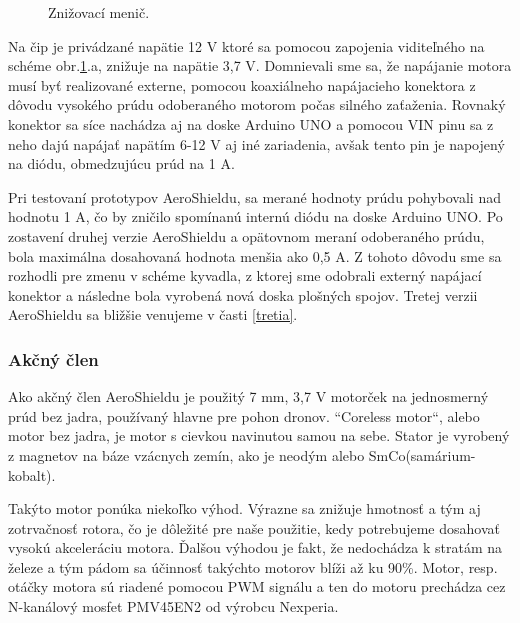 \begin{figure}[!tbh]
	\hfill
	\hfill
	\hfill
	\caption{Znižovací menič.}\label{OBRAZOK 2.1}
\end{figure}

Na čip je privádzané napätie 12 V ktoré sa pomocou zapojenia viditeľného na schéme obr.\ref{OBRAZOK 2.1}.a, znižuje na napätie 3,7 V. Domnievali sme sa, že napájanie motora musí byť realizované externe, pomocou koaxiálneho napájacieho konektora z dôvodu vysokého prúdu odoberaného motorom počas silného zaťaženia. Rovnaký konektor sa síce nachádza aj na doske Arduino UNO a pomocou VIN pinu sa z neho dajú napájať napätím 6-12 V aj iné zariadenia, avšak tento pin je napojený na diódu, obmedzujúcu prúd na 1 A\cite{ampere}\cite{ampere2}. 

Pri testovaní prototypov AeroShieldu, sa merané hodnoty prúdu pohybovali nad hodnotu 1 A, čo by zničilo spomínanú internú diódu na doske Arduino UNO. 
Po zostavení druhej verzie AeroShieldu a opätovnom meraní odoberaného prúdu, bola maximálna dosahovaná hodnota menšia ako 0,5 A. Z tohoto dôvodu sme sa rozhodli pre zmenu v schéme kyvadla, z ktorej sme odobrali externý napájací konektor a následne bola vyrobená nová doska plošných spojov. Tretej verzii AeroShieldu sa bližšie venujeme v časti \ref{tretia}.

\subsubsection{Akčný člen}
\label{akcclen}

Ako akčný člen AeroShieldu je použitý 7 mm, 3,7 V motorček na jednosmerný prúd bez jadra, používaný hlavne pre pohon dronov. “Coreless motor“, alebo motor bez jadra, je motor s cievkou navinutou samou na sebe\cite{coreless}. Stator je vyrobený z magnetov na báze vzácnych zemín, ako je neodým alebo SmCo(samárium-kobalt).

Takýto motor ponúka niekoľko výhod. Výrazne sa znižuje hmotnosť a tým aj zotrvačnosť rotora, čo je dôležité pre naše použitie, kedy potrebujeme dosahovať vysokú akceleráciu motora. Ďalšou výhodou je fakt, že nedochádza k stratám na železe a tým pádom sa účinnosť takýchto motorov blíži až ku 90\%\cite{5545147}. Motor, resp. otáčky motora sú riadené pomocou PWM signálu a ten do motoru prechádza cez N-kanálový mosfet PMV45EN2 od výrobcu Nexperia\cite{pmv}.



